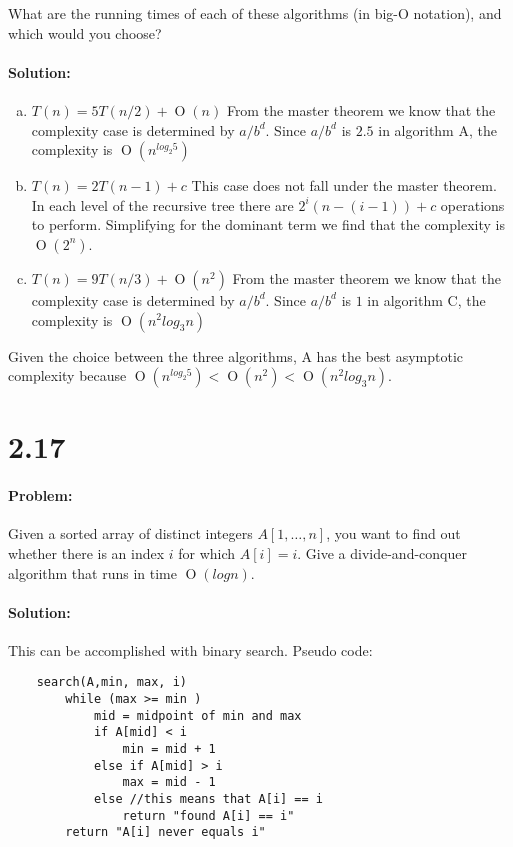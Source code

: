 \documentclass[12pt]{article}
\newcommand{\BigO}[1]{\ensuremath{\operatorname{O}\left(#1\right)}}
\begin{document}
\noindent What are the running times of each of these algorithms (in big-O
notation), and which would you choose?

\paragraph{Solution:}
\begin{enumerate}[(a)]
\item $T(n) = 5T(n/2) + \BigO{n}$
    From the master theorem we know that the complexity case is determined
    by $a/b^{d}$.  Since $a/b^{d}$ is $2.5$ in algorithm A, the complexity
    is $\BigO{n^{log_2 5}}$

\item $T(n) = 2T(n-1) + c$
    This case does not fall under the master theorem.  In each level of
    the	recursive tree there are $2^{i}(n-(i-1)) +c$ operations to perform.
    Simplifying for the dominant term we find that the complexity is
    $\BigO{2^{n}}$.

\item $T(n) = 9T(n/3) + \BigO{n^2}$
    From the master theorem we know that the complexity case is determined
    by $a/b^{d}$.  Since $a/b^{d}$ is $1$ in algorithm C, the complexity is
    $\BigO{n^{2}log_3 n}$
\end{enumerate}

Given the choice between the three algorithms, A has the best asymptotic
complexity because $\BigO{n^{log_2 5}} < \BigO{n^{2}} < \BigO{n^{2}log_3 n}$.

\section*{2.17}
\paragraph{Problem:}

Given a sorted array of distinct integers $A[1, \dots , n]$, you want to
find out whether there is an index $i$ for which $A[i] = i$. Give a
divide-and-conquer algorithm that runs in time $\BigO{log n}$.

\paragraph{Solution:}
This can be accomplished with binary search. Pseudo code:
\begin{verbatim}
    search(A,min, max, i)
        while (max >= min )
            mid = midpoint of min and max
            if A[mid] < i
                min = mid + 1
            else if A[mid] > i
                max = mid - 1
            else //this means that A[i] == i
                return "found A[i] == i"
        return "A[i] never equals i"
\end{verbatim}
\end{document}
